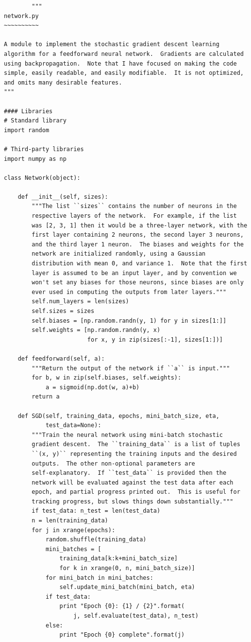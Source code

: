 \begin{lstlisting}
		"""
network.py
~~~~~~~~~~

A module to implement the stochastic gradient descent learning
algorithm for a feedforward neural network.  Gradients are calculated
using backpropagation.  Note that I have focused on making the code
simple, easily readable, and easily modifiable.  It is not optimized,
and omits many desirable features.
"""

#### Libraries
# Standard library
import random

# Third-party libraries
import numpy as np

class Network(object):

    def __init__(self, sizes):
        """The list ``sizes`` contains the number of neurons in the
        respective layers of the network.  For example, if the list
        was [2, 3, 1] then it would be a three-layer network, with the
        first layer containing 2 neurons, the second layer 3 neurons,
        and the third layer 1 neuron.  The biases and weights for the
        network are initialized randomly, using a Gaussian
        distribution with mean 0, and variance 1.  Note that the first
        layer is assumed to be an input layer, and by convention we
        won't set any biases for those neurons, since biases are only
        ever used in computing the outputs from later layers."""
        self.num_layers = len(sizes)
        self.sizes = sizes
        self.biases = [np.random.randn(y, 1) for y in sizes[1:]]
        self.weights = [np.random.randn(y, x)
                        for x, y in zip(sizes[:-1], sizes[1:])]

    def feedforward(self, a):
        """Return the output of the network if ``a`` is input."""
        for b, w in zip(self.biases, self.weights):
            a = sigmoid(np.dot(w, a)+b)
        return a

    def SGD(self, training_data, epochs, mini_batch_size, eta,
            test_data=None):
        """Train the neural network using mini-batch stochastic
        gradient descent.  The ``training_data`` is a list of tuples
        ``(x, y)`` representing the training inputs and the desired
        outputs.  The other non-optional parameters are
        self-explanatory.  If ``test_data`` is provided then the
        network will be evaluated against the test data after each
        epoch, and partial progress printed out.  This is useful for
        tracking progress, but slows things down substantially."""
        if test_data: n_test = len(test_data)
        n = len(training_data)
        for j in xrange(epochs):
            random.shuffle(training_data)
            mini_batches = [
                training_data[k:k+mini_batch_size]
                for k in xrange(0, n, mini_batch_size)]
            for mini_batch in mini_batches:
                self.update_mini_batch(mini_batch, eta)
            if test_data:
                print "Epoch {0}: {1} / {2}".format(
                    j, self.evaluate(test_data), n_test)
            else:
                print "Epoch {0} complete".format(j)


\end{lstlisting}
